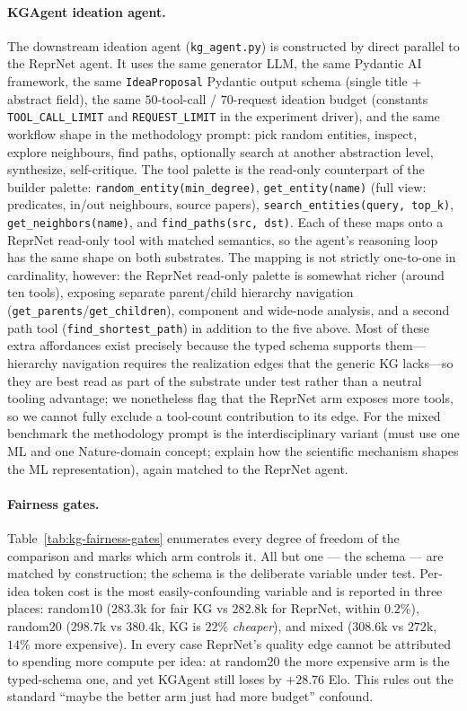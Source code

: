 \documentclass[10pt,twocolumn]{article}
\begin{document}
\paragraph{KGAgent ideation agent.}  The downstream ideation
agent (\texttt{kg\_agent.py}) is constructed by direct parallel to
the ReprNet agent.  It uses the same generator LLM, the same
Pydantic AI framework, the same \texttt{IdeaProposal} Pydantic
output schema (single title + abstract field), the same
$50$-tool-call / $70$-request ideation budget (constants
\texttt{TOOL\_CALL\_LIMIT} and \texttt{REQUEST\_LIMIT} in the
experiment driver), and the same workflow shape in the
methodology prompt: pick random entities, inspect, explore
neighbours, find paths, optionally search at another abstraction
level, synthesize, self-critique.  The tool palette is the
read-only counterpart of the builder palette:
\texttt{random\_entity(min\_degree)},
\texttt{get\_entity(name)} (full view: predicates, in/out
neighbours, source papers),
\texttt{search\_entities(query, top\_k)},
\texttt{get\_neighbors(name)}, and
\texttt{find\_paths(src, dst)}.  Each of these maps onto a ReprNet
read-only tool with matched semantics, so the agent's reasoning loop
has the same shape on both substrates.  The mapping is not strictly
one-to-one in cardinality, however: the ReprNet read-only palette is
somewhat richer (around ten tools), exposing separate parent/child
hierarchy navigation (\texttt{get\_parents}/\texttt{get\_children}),
component and wide-node analysis, and a second path tool
(\texttt{find\_shortest\_path}) in addition to the five above.  Most
of these extra affordances exist precisely because the typed schema
supports them---hierarchy navigation requires the realization edges
that the generic KG lacks---so they are best read as part of the
substrate under test rather than a neutral tooling advantage; we
nonetheless flag that the ReprNet arm exposes more tools, so we cannot
fully exclude a tool-count contribution to its edge.  For the mixed
benchmark the methodology prompt is the interdisciplinary variant
(must use one ML and one Nature-domain concept; explain how the
scientific mechanism shapes the ML representation), again
matched to the ReprNet agent.

\paragraph{Fairness gates.}  Table~\ref{tab:kg-fairness-gates}
enumerates every degree of freedom of the comparison and marks
which arm controls it.  All but one --- the schema --- are matched
by construction; the schema is the deliberate variable under
test.  Per-idea token cost is the most easily-confounding variable
and is reported in three places: random10 ($283.3$k for fair KG
vs $282.8$k for ReprNet, within $0.2\%$), random20 ($298.7$k vs
$380.4$k, KG is $22\%$ \emph{cheaper}), and mixed ($308.6$k vs
$272$k, $14\%$ more expensive).  In every case ReprNet's quality
edge cannot be attributed to spending more compute per idea: at
random20 the more expensive arm is the typed-schema one, and yet
KGAgent still loses by $+28.76$ Elo.  This rules out the standard
``maybe the better arm just had more budget'' confound.
\end{document}
